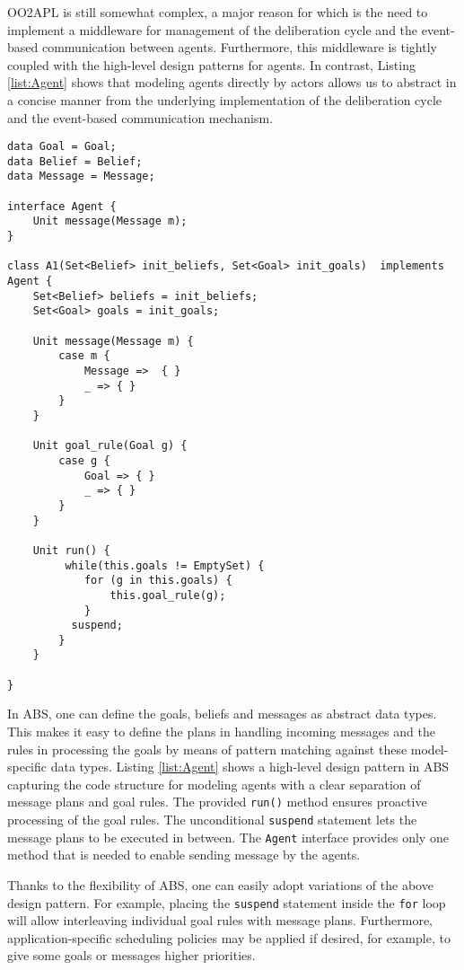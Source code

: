 OO2APL is still somewhat complex, a major reason for which is the need to implement a middleware for management of the deliberation cycle and the event-based communication between agents. 
Furthermore, this middleware is tightly coupled with the high-level design patterns for agents.
In contrast,  Listing \ref{list:Agent} shows that modeling agents directly by actors  allows us to abstract in a concise manner from the underlying implementation of the deliberation cycle  and the event-based communication mechanism.



\begin{lstlisting}[caption= Generic Agent Model, label=list:Agent]
data Goal = Goal;
data Belief = Belief;
data Message = Message;

interface Agent {
	Unit message(Message m);
}

class A1(Set<Belief> init_beliefs, Set<Goal> init_goals)  implements Agent {
	Set<Belief> beliefs = init_beliefs;
	Set<Goal> goals = init_goals;
	
	Unit message(Message m) {
		case m { 
			Message =>  { }
			_ => { }
		}
	}
	
	Unit goal_rule(Goal g) {
		case g {
			Goal => { }
			_ => { }
		}
	}
	
	Unit run() {
		 while(this.goals != EmptySet) {
  		    for (g in this.goals) {
		        this.goal_rule(g);
		    }
		  suspend;
		}
	}

}

\end{lstlisting}



In ABS, one can define the goals, beliefs and messages as abstract data types.
This makes it easy to define the plans in handling incoming messages and the rules in processing the goals by means of pattern matching against these model-specific data types.
Listing \ref{list:Agent} shows a high-level design pattern in ABS capturing the code structure for modeling agents with a clear separation of message plans and goal rules. 
The provided \lstinline|run()| method ensures proactive processing of the goal rules. 
The unconditional \lstinline|suspend| statement lets the message plans to be executed in between. 
The \lstinline|Agent| interface provides only one method that is needed to enable sending message by the agents. 

Thanks to the flexibility of ABS, one can easily adopt variations of the above design pattern.
For example, placing the \lstinline|suspend| statement inside the \lstinline|for| loop will allow interleaving individual goal rules with message plans.
Furthermore, application-specific scheduling policies \cite{rabs,cog}  may be applied if desired, for example, to give some goals or messages higher priorities.



